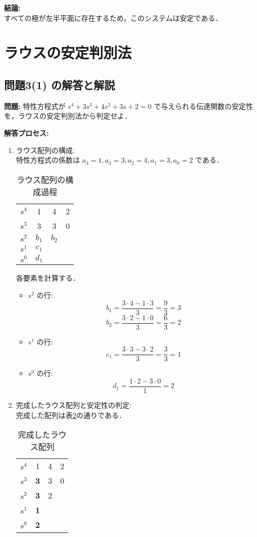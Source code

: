 \documentclass[11pt,a4paper]{ltjsarticle}
\begin{document}
\textbf{結論:}\\
すべての極が左半平面に存在するため，このシステムは安定である．

\section{ラウスの安定判別法}

\subsection{問題3(1) の解答と解説}

\textbf{問題:} 特性方程式が $s^4+3s^3+4s^2+3s+2=0$ で与えられる伝達関数の安定性を，ラウスの安定判別法から判定せよ．

\textbf{解答プロセス:}

\begin{enumerate}
\item ラウス配列の構成:\\
特性方程式の係数は $a_4=1, a_3=3, a_2=4, a_1=3, a_0=2$ である．

\begin{table}[ht]
\centering
\caption{ラウス配列の構成過程}
\label{tbl:routh1}
\begin{tabular}{cccc}
\toprule
$s^4$ & 1 & 4 & 2 \\
$s^3$ & 3 & 3 & 0 \\
$s^2$ & $b_1$ & $b_2$ & \\
$s^1$ & $c_1$ & & \\
$s^0$ & $d_1$ & & \\
\bottomrule
\end{tabular}
\end{table}

各要素を計算する．
\begin{itemize}
\item $s^2$ の行:
$$b_1 = \frac{3 \cdot 4 - 1 \cdot 3}{3} = \frac{9}{3} = 3$$
$$b_2 = \frac{3 \cdot 2 - 1 \cdot 0}{3} = \frac{6}{3} = 2$$
\item $s^1$ の行:
$$c_1 = \frac{3 \cdot 3 - 3 \cdot 2}{3} = \frac{3}{3} = 1$$
\item $s^0$ の行:
$$d_1 = \frac{1 \cdot 2 - 3 \cdot 0}{1} = 2$$
\end{itemize}

\item 完成したラウス配列と安定性の判定:\\
完成した配列は表\ref{tbl:routh1_complete}の通りである．

\begin{table}[ht]
\centering
\caption{完成したラウス配列}
\label{tbl:routh1_complete}
\begin{tabular}{cccc}
\toprule
$s^4$ & 1 & 4 & 2 \\
$s^3$ & \textbf{3} & 3 & 0 \\
$s^2$ & \textbf{3} & 2 & \\
$s^1$ & \textbf{1} & & \\
$s^0$ & \textbf{2} & & \\
\bottomrule
\end{tabular}
\end{table}


\end{enumerate}
\end{document}
